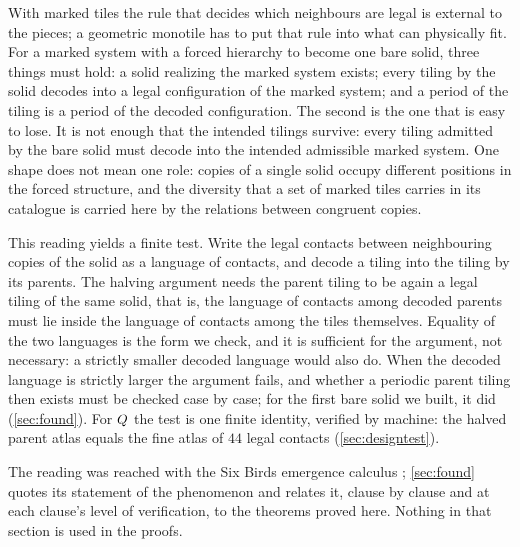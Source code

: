 With marked tiles the rule that decides which neighbours are legal is external to the pieces; a
geometric monotile has to put that rule into what can physically fit. For a marked system with a
forced hierarchy to become one bare solid, three things must hold: a solid realizing the marked
system exists; every tiling by the solid decodes into a legal configuration of the marked
system; and a period of the tiling is a period of the decoded configuration. The second is the
one that is easy to lose. It is not enough that the intended tilings survive: every tiling
admitted by the bare solid must decode into the intended admissible marked system. One shape does
not mean one role: copies of a
single solid occupy different positions in the forced structure, and the diversity that a set of
marked tiles carries in its catalogue is carried here by the relations between congruent copies.

This reading yields a finite test. Write the legal contacts between neighbouring copies of the
solid as a language of contacts, and decode a tiling into the tiling by its parents. The halving
argument needs the parent tiling to be again a legal tiling of the same solid, that is, the
language of contacts among decoded parents must lie inside the language of contacts among the
tiles themselves. Equality of the two languages is the form we check, and it is sufficient for
the argument, not necessary: a strictly smaller decoded language would also do. When the decoded
language is strictly larger the argument fails, and whether a periodic parent tiling then exists
must be checked case by case; for the first bare solid we built, it did (\cref{sec:found}). For
$Q$ the test is one finite identity, verified by machine: the halved parent atlas equals the
fine atlas of $44$ legal contacts (\cref{sec:designtest}).

The reading was reached with the Six Birds emergence calculus \cite{Tsi26F6,Tsi26F4,Tsi26NDO};
\cref{sec:found} quotes its statement of the phenomenon and relates it, clause by clause and at
each clause's level of verification, to the theorems proved here. Nothing in that section is used
in the proofs.

